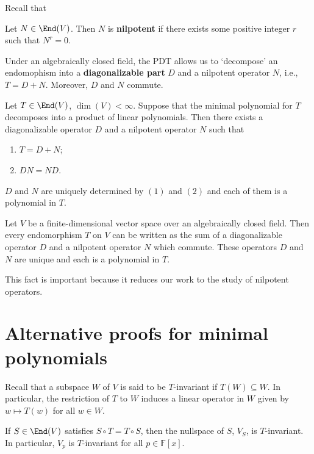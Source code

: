 Recall that

\begin{definition}
  Let $N \in \End(V)$. Then $N$ is \textbf{nilpotent} if there exists some positive integer $r$ such that $N^r = 0$.
\end{definition}

Under an algebraically closed field, the PDT allows us to `decompose' an endomophism into a \textbf{diagonalizable part} $D$ and a nilpotent operator $N$, i.e., $T = D + N$. Moreover, $D$ and $N$ commute.

\begin{theorem}
  Let $T \in \End(V)$, $\dim(V) < \infty$. Suppose that the minimal polynomial for $T$ decomposes into a product of linear polynomials. Then there exists a diagonalizable operator $D$ and a nilpotent operator $N$ such that 
  \begin{enumerate}
    \item $T = D + N$;
    \item $DN = ND$.
  \end{enumerate}

  $D$ and $N$ are uniquely determined by $(1)$ and $(2)$ and each of them is a polynomial in $T$.
\end{theorem}

\begin{corollary}
  Let $V$ be a finite-dimensional vector space over an algebraically closed field. Then every endomorphism $T$ on $V$ can be written as the sum of a diagonalizable operator $D$ and a nilpotent operator $N$ which commute. These operators $D$ and $N$ are unique and each is a polynomial in $T$.
\end{corollary}

This fact is important because it reduces our work to the study of nilpotent operators. 

\section{Alternative proofs for minimal polynomials}

Recall that a subspace $W$ of $V$ is said to be $T$-invariant if $T(W) \subseteq W$. In particular, the restriction of $T$ to $W$ induces a linear operator in $W$ given by $w \mapsto T(w)$ for all $w \in W$.

\begin{lemma}
	If $S \in \End(V)$ satisfies $S \circ T = T \circ S$, then the nullspace of $S$, $V_S$, is $T$-invariant. In particular, $V_p$ is $T$-invariant for all $p \in \mathbb{F}[x]$.
\end{lemma}

